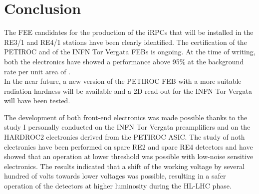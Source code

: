 	\section{Conclusion}
	\label{chapt6:sec:concl}
    
    The \acl{FEE} candidates for the production of the \acl{iRPC}s that will be installed in the RE3/1 and RE4/1 stations have been clearly identified. The certification of the PETIROC and of the INFN Tor Vergata FEBs is ongoing. At the time of writing, both the electronics have showed a performance above 95\% at the background rate per unit area of .\\
	In the near future, a new version of the PETIROC FEB with a more suitable radiation hardness will be available and a 2D read-out for the INFN Tor Vergata will have been tested.

	The development of both front-end electronics was made possible thanks to the study I personally conducted on the INFN Tor Vergata preamplifiers and on the HARDROC2 electronics derived from the PETIROC ASIC. The study of noth electronics have been performed on spare RE2 and spare RE4 detectors and have showed that an operation at lower threshold was possible with low-noise sensitive electronics. The results indicated that a shift of the working voltage by several hundred of volts towards lower voltages was possible, resulting in a safer operation of the detectors at higher luminosity during the HL-LHC phase.

\clearpage{\pagestyle{empty}\cleardoublepage}